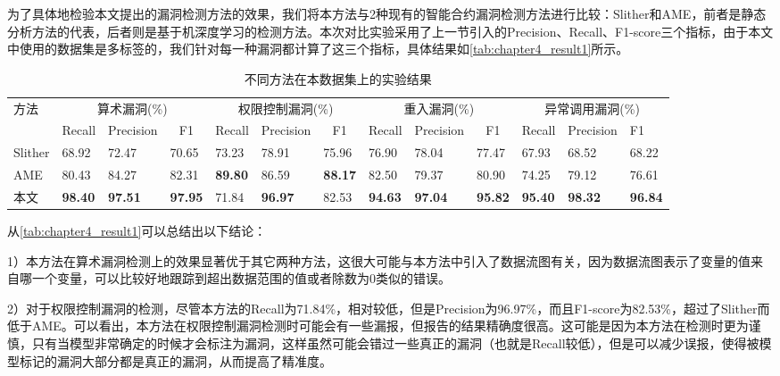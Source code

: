 为了具体地检验本文提出的漏洞检测方法的效果，我们将本方法与2种现有的智能合约漏洞检测方法进行比较：Slither\cite{slither}和AME\cite{liu2021smart}，前者是静态分析方法的代表，后者则是基于机深度学习的检测方法。本次对比实验采用了上一节引入的Precision、Recall、F1-score三个指标，由于本文中使用的数据集是多标签的，我们针对每一种漏洞都计算了这三个指标，具体结果如\autoref{tab:chapter4_result1}所示。
\begin{table}[htbp]
    \caption{\label{tab:chapter4_result1}不同方法在本数据集上的实验结果}
    \fontsize{8pt}{10pt}\selectfont
    \renewcommand{\arraystretch}{1.5}
    \begin{tabularx}{\linewidth}{p{1.3cm}|X<{\centering}X<{\centering}X<{\centering}|X<{\centering}X<{\centering}X<{\centering}|X<{\centering}X<{\centering}X<{\centering}|X<{\centering}X<{\centering}X<{\centering}}
        \hline
        \multirow{2}{*}{方法} & \multicolumn{3}{c|}{算术漏洞(\%)} & \multicolumn{3}{c|}{权限控制漏洞(\%)} & \multicolumn{3}{c|}{重入漏洞(\%)} & \multicolumn{3}{c}{异常调用漏洞(\%)} \\ \cline{2-13} 
                            & {Recall} & {Precision} & \multicolumn{1}{c|}{F1} & {Recall} & {Precision} & \multicolumn{1}{c|}{F1} & {Recall} & {Precision} & \multicolumn{1}{c|}{F1} & {Recall} & {Precision} & {F1} \\ \hline
        Slither & 68.92 & 72.47 & 70.65       & 73.23 & 78.91 & 75.96       & 76.90 & 78.04 & 77.47       & 67.93 & 68.52 & 68.22      \\
        AME & 80.43 & 84.27 & 82.31       & \textbf{89.80} & 86.59 & \textbf{88.17} & 82.50 & 79.37 & 80.90       & 74.25 & 79.12 & 76.61      \\
        本文      & \textbf{98.40} & \textbf{97.51}    & \textbf{97.95} & 71.84 & \textbf{96.97}    & 82.53       & \textbf{94.63} & \textbf{97.04}    & \textbf{95.82} & \textbf{95.40} & \textbf{98.32}    & \textbf{96.84}         \\ \hline
        \end{tabularx}
\end{table}

从\autoref{tab:chapter4_result1}可以总结出以下结论：

1）本方法在算术漏洞检测上的效果显著优于其它两种方法，这很大可能与本方法中引入了数据流图有关，因为数据流图表示了变量的值来自哪一个变量，可以比较好地跟踪到超出数据范围的值或者除数为0类似的错误。

2）对于权限控制漏洞的检测，尽管本方法的Recall为71.84\%，相对较低，但是Precision为96.97\%，而且F1-score为82.53\%，超过了Slither而低于AME。可以看出，本方法在权限控制漏洞检测时可能会有一些漏报，但报告的结果精确度很高。这可能是因为本方法在检测时更为谨慎，只有当模型非常确定的时候才会标注为漏洞，这样虽然可能会错过一些真正的漏洞（也就是Recall较低），但是可以减少误报，使得被模型标记的漏洞大部分都是真正的漏洞，从而提高了精准度。

